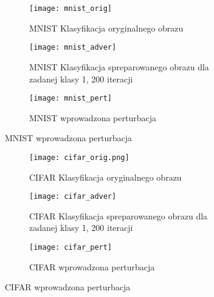 \documentclass{article}
\begin{document}
\begin{figure}[ht]
  \begin{subfigure}{.55\textwidth}
    \texttt{[image: mnist\_orig]}
    \caption{MNIST Klasyfikacja oryginalnego obrazu}
    \centering
  \end{subfigure}
  \begin{subfigure}{.55\textwidth}
    \texttt{[image: mnist\_adver]}
    \caption{MNIST Klasyfikacja spreparowanego obrazu dla zadanej klasy 1, 200 iteracji}
    \centering
  \end{subfigure}
  \begin{subfigure}{.55\textwidth}
    \texttt{[image: mnist\_pert]}
    \caption{MNIST wprowadzona perturbacja}
    \centering
  \end{subfigure}
\end{figure}
\begin{figure}[ht]
  \begin{subfigure}{.55\textwidth}
    \texttt{[image: cifar\_orig.png]}
    \caption{CIFAR Klasyfikacja oryginalnego obrazu}
    \centering
  \end{subfigure}
  \begin{subfigure}{.55\textwidth}
    \texttt{[image: cifar\_adver]}
    \caption{CIFAR Klasyfikacja spreparowanego obrazu dla zadanej klasy 1, 200 iteracji}
    \centering
  \end{subfigure}
  \begin{subfigure}{.55\textwidth}
    \texttt{[image: cifar\_pert]}
    \caption{CIFAR wprowadzona perturbacja}
    \centering
  \end{subfigure}
\end{figure}

\clearpage







\end{document}
